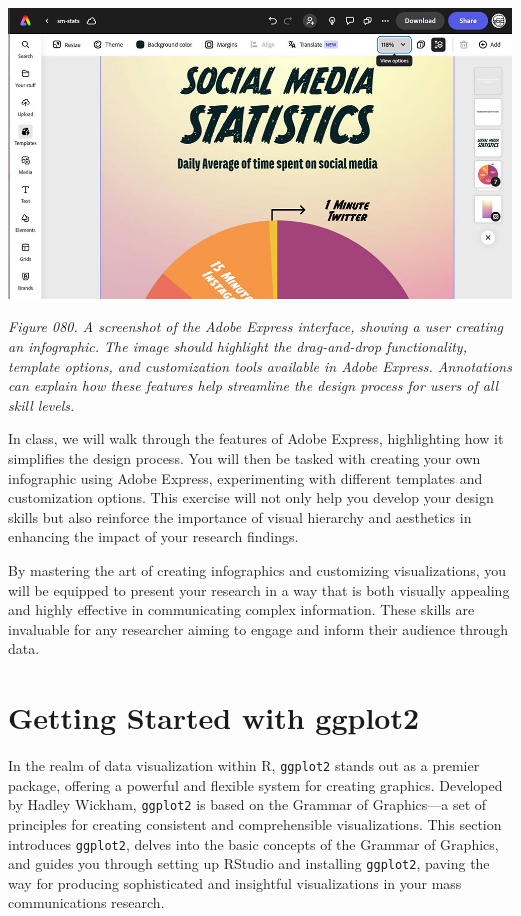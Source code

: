 \documentclass[
]{book}
\begin{document}
\includegraphics[width=1\textwidth,height=\textheight]{images/fig080.jpg}

\emph{Figure 080. A screenshot of the Adobe Express interface, showing a user creating an infographic. The image should highlight the drag-and-drop functionality, template options, and customization tools available in Adobe Express. Annotations can explain how these features help streamline the design process for users of all skill levels.}

In class, we will walk through the features of Adobe Express, highlighting how it simplifies the design process. You will then be tasked with creating your own infographic using Adobe Express, experimenting with different templates and customization options. This exercise will not only help you develop your design skills but also reinforce the importance of visual hierarchy and aesthetics in enhancing the impact of your research findings.

By mastering the art of creating infographics and customizing visualizations, you will be equipped to present your research in a way that is both visually appealing and highly effective in communicating complex information. These skills are invaluable for any researcher aiming to engage and inform their audience through data.

\section{Getting Started with ggplot2}\label{getting-started-with-ggplot2}

In the realm of data visualization within R, \texttt{ggplot2} stands out as a premier package, offering a powerful and flexible system for creating graphics. Developed by Hadley Wickham, \texttt{ggplot2} is based on the Grammar of Graphics---a set of principles for creating consistent and comprehensible visualizations. This section introduces \texttt{ggplot2}, delves into the basic concepts of the Grammar of Graphics, and guides you through setting up RStudio and installing \texttt{ggplot2}, paving the way for producing sophisticated and insightful visualizations in your mass communications research.
\end{document}
